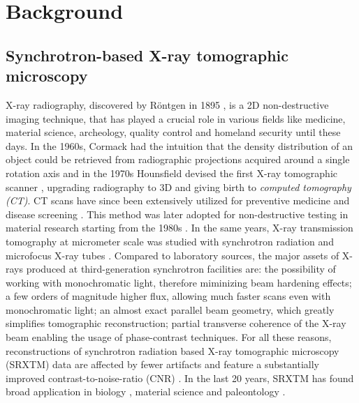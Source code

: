 {
\chapter{Background}
\color{black}

\section{Synchrotron-based X-ray tomographic microscopy}
\label{introduction:synchrotron-based-x-ray-microtomography}
X-ray radiography, discovered by R\"{o}ntgen in 1895 \cite{Roentgen1895}, is a 2D non-destructive imaging technique, that has played
a crucial role in various fields like medicine, material science, archeology, quality control and homeland security until these days. 
In the 1960s,
Cormack had the intuition that the density distribution of an object could be retrieved from radiographic projections
acquired around a single rotation axis \cite{Cormack1963} and
in the 1970s Hounsfield devised the first X-ray tomographic scanner \cite{Hounsfield1973}, upgrading radiography to 3D and 
giving birth to \emph{computed tomography (CT)}. CT scans have since been extensively utilized for preventive medicine and disease screening
\cite{Hsieh2009}. This method was later adopted for non-destructive testing in material research starting from the 1980s \cite{Reimers1983,Kanamori1986}.
In the same years, X-ray transmission tomography at micrometer scale was studied with synchrotron radiation \cite{Grodzins1983} and microfocus 
X-ray tubes \cite{Flannery1987}. 
\newline
Compared to laboratory sources, the major assets of X-rays produced at third-generation synchrotron facilities are:
the possibility of working with monochromatic light, therefore miminizing beam hardening effects; a few orders of magnitude higher flux, allowing 
much faster scans even with monochromatic light; an almost exact parallel beam geometry, which greatly simplifies tomographic reconstruction; 
partial transverse coherence of the X-ray beam enabling the usage of phase-contrast techniques. For all these reasons, 
reconstructions of synchrotron radiation based X-ray tomographic microscopy (SRXTM) data are affected by fewer artifacts and
feature a substantially improved contrast-to-noise-ratio (CNR) \cite{Bonse1996}.
\newline
In the last 20 years, SRXTM has found broad application in biology \cite{Ruegsegger1996,Westneat2003,Plouraboue2004,Cloetens2006,Betz2007,Lovric2013}, material science 
\cite{Baruchel2006,Beckmann2004,Uesugi2004,Lee1997,Wang2001,Snigirev1995,Cloetens1999} and paleontology \cite{Chen2006,Donoghue2006}.
}
